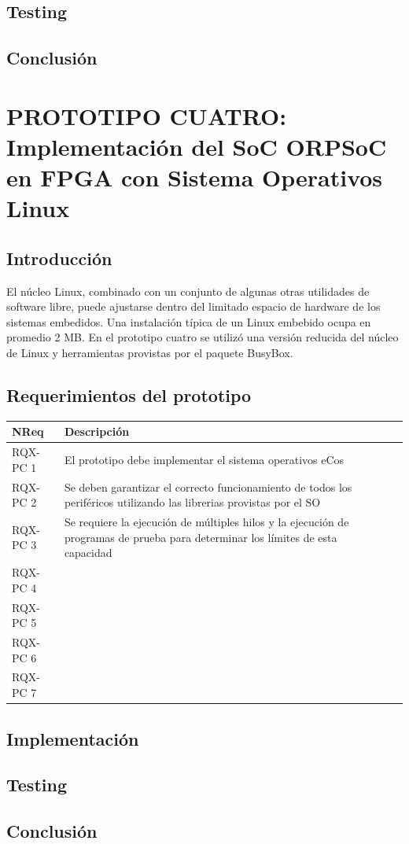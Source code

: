 		\subsection{Testing}
		
		\subsection{Conclusión}


\newpage
				
	\section{PROTOTIPO CUATRO: Implementación del SoC ORPSoC en FPGA con Sistema Operativos Linux}
		\subsection{Introducción}
		El núcleo Linux, combinado con un conjunto de algunas otras utilidades de software libre, puede ajustarse dentro del limitado espacio de hardware 
	    de los sistemas embedidos. Una instalación típica de un Linux embebido ocupa en promedio 2 MB. En el prototipo cuatro se utilizó una versión
	    reducida del núcleo de Linux y herramientas provistas por el paquete BusyBox. 
		
		\subsection{Requerimientos del prototipo}
		
		\begin{table}[h]
		\centering	
		\begin{tabular}{ p{2.5cm} p{8cm} p{3cm} }
		\hline 
		\rowcolor[gray]{0.8} N\textordmasculine Req & Descripción\\
		\hline 
		RQX-PC 1 & El prototipo debe implementar el sistema operativos eCos\\ 
		\hline 
		RQX-PC 2 & Se deben garantizar el correcto funcionamiento de todos los periféricos utilizando las librerias provistas por el SO\\ 
		\hline 
		RQX-PC 3 & Se requiere la ejecución de múltiples hilos y la ejecución de programas de prueba para determinar los límites de esta capacidad \\ 
		\hline
		RQX-PC 4 & \\
		\hline
		RQX-PC 5 & \\
		\hline
		RQX-PC 6 & \\
		\hline
		RQX-PC 7 & \\
		\hline		
		\end{tabular}
		\end{table}
		
		
		\subsection{Implementación}

		
		\subsection{Testing}
		
		\subsection{Conclusión}
